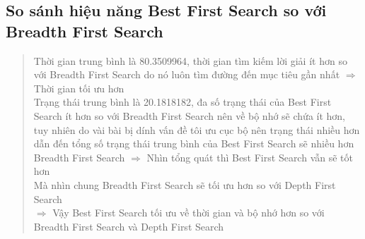 \documentclass[11pt,a4paper]{article}
\begin{document}
\subsection{So sánh hiệu năng Best First Search so với Breadth First Search}
\begin{center}
	\begin{quotation}
		\textbullet \hspace{0.25 cm} Thời gian trung bình là 80.3509964, thời gian tìm kiếm lời giải ít hơn so với Breadth First Search do nó luôn tìm đường đến mục tiêu gần nhất $\Rightarrow$ Thời gian tối ưu hơn \\
		\textbullet	\hspace{0.25 cm}	Trạng thái trung bình là 20.1818182, đa số trạng thái của Best First Search ít hơn so với Breadth First Search nên về bộ nhớ sẽ chứa ít hơn, tuy nhiên do vài bài bị dính vấn đề tôi ưu cục bộ nên trạng thái nhiều hơn dẫn đến tổng số trạng thái trung bình của Best First Search sẽ nhiều hơn Breadth First Search $\Rightarrow$ Nhìn tổng quát thì Best First Search vẫn sẽ tốt hơn\\
		\textbullet \hspace{0.25 cm} Mà nhìn chung Breadth First Search sẽ tối ưu hơn so với Depth First Search\\
		$\Rightarrow$ Vậy Best First Search tối ưu về thời gian và bộ nhớ hơn so với Breadth First Search và Depth First Search
	\end{quotation}	
\end{center}
\end{document}
